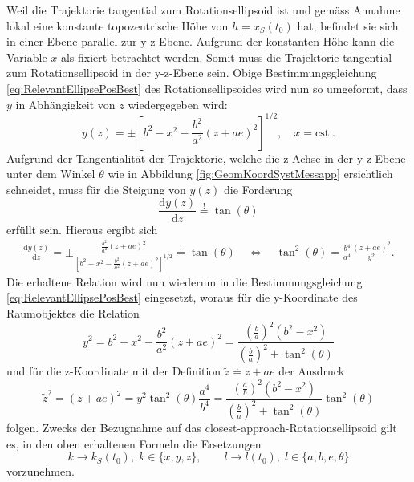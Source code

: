 \documentclass[a4paper,12pt]{article}
\numberwithin{equation}{section}
\begin{document}
Weil die Trajektorie tangential zum Rotationsellipsoid ist und gemäss Annahme lokal eine konstante topozentrische Höhe von $h=x_S(t_0)$ hat, befindet sie sich in einer Ebene parallel zur y-z-Ebene. Aufgrund der konstanten Höhe kann die Variable $x$ als fixiert betrachtet werden. Somit muss die Trajektorie tangential zum Rotationsellipsoid in der y-z-Ebene sein. Obige Bestimmungsgleichung \eqref{eq:RelevantEllipsePosBest} des Rotationsellipsoides wird nun so umgeformt, dass $y$ in Abhängigkeit von $z$ wiedergegeben wird:
\begin{equation}
y(z) = \pm \left[b^2-x^2-\frac{b^2}{a^2}(z+ae)^2\right]^{1/2}, \quad x = \text{cst}\;.
\end{equation} Aufgrund der Tangentialität der Trajektorie, welche die z-Achse in der y-z-Ebene unter dem Winkel $\theta$ wie in Abbildung \ref{fig:GeomKoordSystMessapp} ersichtlich schneidet, muss für die Steigung von $y(z)$ die Forderung \begin{equation}
\frac{\mathrm{d}y(z)}{\mathrm{d}z} \overset{!}{=} \tan(\theta)
\end{equation} erfüllt sein. Hieraus ergibt sich \begin{gather}
\frac{\mathrm{d}y(z)}{\mathrm{d}z} = \pm \frac{\frac{b^2}{a^2}(z+ae)^2}{\left[b^2-x^2-\frac{b^2}{a^2}(z+ae)^2\right]^{1/2}} \overset{!}{=} \tan(\theta) \quad \Leftrightarrow \quad \tan^2(\theta) = \frac{b^4}{a^4}\frac{(z+ae)^2}{y^2}.
\end{gather} Die erhaltene Relation wird nun wiederum in die Bestimmungsgleichung \eqref{eq:RelevantEllipsePosBest} eingesetzt, woraus für die y-Koordinate des Raumobjektes die Relation \begin{equation}
y^2 = b^2-x^2-\frac{b^2}{a^2}(z+ae)^2 = \frac{\left(\frac{b}{a}\right)^2(b^2-x^2)}{\left(\frac{b}{a}\right)^2+\tan^2(\theta)}
\end{equation} und für die z-Koordinate mit der Definition $\tilde{z} \doteq z+ae$ der Ausdruck \begin{equation}
\tilde{z}^2 = (z+ae)^2 = y^2\tan^2(\theta)\frac{a^4}{b^4} = \frac{\left(\frac{a}{b}\right)^2(b^2-x^2)}{\left(\frac{b}{a}\right)^2+\tan^2(\theta)}\tan^2(\theta)
\end{equation} folgen. Zwecks der Bezugnahme auf das \flqq closest-approach\frqq-Rotationsellipsoid gilt es, in den oben erhaltenen Formeln die Ersetzungen \begin{equation}\label{eq:Notationfinalresult}
k \rightarrow k_S(t_0), \; k \in \{x,y,z\}, \qquad l \rightarrow l(t_0), \; l \in \{a,b,e,\theta\}
\end{equation} vorzunehmen.
\end{document}
